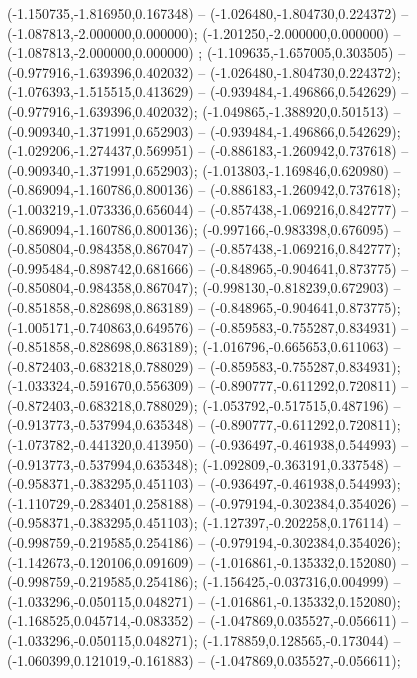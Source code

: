  (-1.150735,-1.816950,0.167348) -- (-1.026480,-1.804730,0.224372) -- (-1.087813,-2.000000,0.000000);
 (-1.201250,-2.000000,0.000000) -- (-1.087813,-2.000000,0.000000) ;
 (-1.109635,-1.657005,0.303505) -- (-0.977916,-1.639396,0.402032) -- (-1.026480,-1.804730,0.224372);
 (-1.076393,-1.515515,0.413629) -- (-0.939484,-1.496866,0.542629) -- (-0.977916,-1.639396,0.402032);
 (-1.049865,-1.388920,0.501513) -- (-0.909340,-1.371991,0.652903) -- (-0.939484,-1.496866,0.542629);
 (-1.029206,-1.274437,0.569951) -- (-0.886183,-1.260942,0.737618) -- (-0.909340,-1.371991,0.652903);
 (-1.013803,-1.169846,0.620980) -- (-0.869094,-1.160786,0.800136) -- (-0.886183,-1.260942,0.737618);
 (-1.003219,-1.073336,0.656044) -- (-0.857438,-1.069216,0.842777) -- (-0.869094,-1.160786,0.800136);
 (-0.997166,-0.983398,0.676095) -- (-0.850804,-0.984358,0.867047) -- (-0.857438,-1.069216,0.842777);
 (-0.995484,-0.898742,0.681666) -- (-0.848965,-0.904641,0.873775) -- (-0.850804,-0.984358,0.867047);
 (-0.998130,-0.818239,0.672903) -- (-0.851858,-0.828698,0.863189) -- (-0.848965,-0.904641,0.873775);
 (-1.005171,-0.740863,0.649576) -- (-0.859583,-0.755287,0.834931) -- (-0.851858,-0.828698,0.863189);
 (-1.016796,-0.665653,0.611063) -- (-0.872403,-0.683218,0.788029) -- (-0.859583,-0.755287,0.834931);
 (-1.033324,-0.591670,0.556309) -- (-0.890777,-0.611292,0.720811) -- (-0.872403,-0.683218,0.788029);
 (-1.053792,-0.517515,0.487196) -- (-0.913773,-0.537994,0.635348) -- (-0.890777,-0.611292,0.720811);
 (-1.073782,-0.441320,0.413950) -- (-0.936497,-0.461938,0.544993) -- (-0.913773,-0.537994,0.635348);
 (-1.092809,-0.363191,0.337548) -- (-0.958371,-0.383295,0.451103) -- (-0.936497,-0.461938,0.544993);
 (-1.110729,-0.283401,0.258188) -- (-0.979194,-0.302384,0.354026) -- (-0.958371,-0.383295,0.451103);
 (-1.127397,-0.202258,0.176114) -- (-0.998759,-0.219585,0.254186) -- (-0.979194,-0.302384,0.354026);
 (-1.142673,-0.120106,0.091609) -- (-1.016861,-0.135332,0.152080) -- (-0.998759,-0.219585,0.254186);
 (-1.156425,-0.037316,0.004999) -- (-1.033296,-0.050115,0.048271) -- (-1.016861,-0.135332,0.152080);
 (-1.168525,0.045714,-0.083352) -- (-1.047869,0.035527,-0.056611) -- (-1.033296,-0.050115,0.048271);
 (-1.178859,0.128565,-0.173044) -- (-1.060399,0.121019,-0.161883) -- (-1.047869,0.035527,-0.056611);
